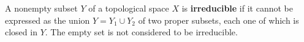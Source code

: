 A nonempty subset $Y$ of a topological space $X$ is \textbf{irreducible} if it cannot be expressed as the union $Y = Y_1 \cup Y_2$ of two proper subsets, each one of which is closed in $Y$. The empty set is not considered to be irreducible.
